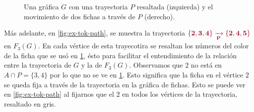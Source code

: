 \begin{figure}[ht!]
    \caption{Una gr\'afica $G$ con una trayectoria $P$ resaltada (izquierda) y
     el movimiento de dos fichas a trav\'es de $P$ (derecho).}
    \label{fig:ex-tok-aux}
\end{figure}
    
M\'as adelante, en \cref{fig:ex-tok-path}, se muestra la trayectoria
${\color{vino}\bf \{2,3,4\}\xrightarrow[P]{}\{2,4,5\}}$ en $F_3(G)$. En cada
v\'ertice de esta trayecotira se resaltan los n\'umeros del color de la ficha
que se us\'o en \cref{fig:ex-tok-aux}, \'esto para facilitar el entendimiento de
la relaci\'on entre la trayectoria de $G$ y la de $F_3(G)$. Observamos que $2$
no est\'a en $A \cap P =\{3,4\}$ por lo que no se ve en \cref{fig:ex-tok-aux}.
Esto significa que la ficha en el v\'ertice $2$ se queda fija a trav\'es de la
trayectoria en la gr\'afica de fichas. Esto se puede ver en
\cref{fig:ex-tok-path} al fijarnos que el $2$ en todos los v\'ertices de la
trayectoria, resaltado en gris.



